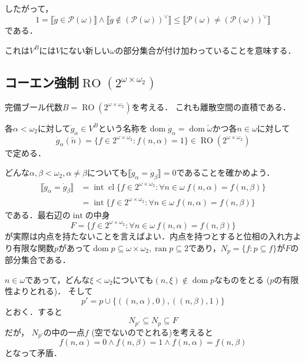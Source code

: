 \documentclass[uplatex,dvipdfmx]{jsarticle}
\newcommand{\PP}{\mathcal{P}}
\newcommand{\range}{\operatorname{ran}}
\newcommand{\dom}{\operatorname{dom}}
\newcommand{\intr}{\operatorname{int}}
\newcommand{\cl}{\operatorname{cl}}
\newcommand{\RO}{\operatorname{RO}}
\renewcommand\subset{\subseteq}
\newcommand{\truth}[1] {\llbracket #1 \rrbracket}
\theoremstyle{definition}
\begin{document}
したがって，
\[
1 = \truth{\dot{g} \in \PP(\omega)} \land \truth{\dot{g} \not \in  (\PP(\omega))^{\vee}} \le \truth{\PP(\omega) \ne (\PP(\omega))^{\vee}}
\]
である．

これは$V^B$には$V$にない新しい$\omega$の部分集合が付け加わっていることを意味する．

\subsection{コーエン強制$\RO(2^{\omega \times \omega_2})$}

完備ブール代数$B = \RO(2^{\omega \times \omega_2})$を考える．
これも離散空間の直積である．

各$\alpha < \omega_2$に対して$\dot{g}_\alpha \in V^B$という名称を$\dom \dot{g}_\alpha = \dom \check{\omega}$かつ各$n \in \omega$に対して
\[
\dot{g}_\alpha(\check{n}) = \{ f \in 2^{\omega \times \omega_2} : f(n, \alpha) = 1 \} \in \RO(2^{\omega \times \omega_2})
\]
で定める．

どんな$\alpha, \beta < \omega_2, \alpha \ne \beta$についても$\truth{\dot{g}_\alpha = \dot{g}_\beta} = 0$であることを確かめよう．
\begin{align*}
\truth{\dot{g}_\alpha = \dot{g}_\beta} &= \intr \cl \{ f \in 2^{\omega \times \omega_2} : \forall n \in \omega\ f(n, \alpha) = f(n, \beta) \} \\
 &= \intr \{ f \in 2^{\omega \times \omega_2} : \forall n \in \omega\ f(n, \alpha) = f(n, \beta) \}
\end{align*}
である．最右辺の$\intr$の中身
\[
F = \{ f \in 2^{\omega \times \omega_2} : \forall n \in \omega\ f(n, \alpha) = f(n, \beta) \}
\]
が実際は内点を持たないことを言えばよい．内点を持つとすると位相の入れ方より有限な関数$p$があって$\dom p \subset \omega \times \omega_2, \range p \subset 2$であり，$N_p = \{ f : p \subset f \}$が$F$の部分集合である．

$n \in \omega$であって，どんな$\xi < \omega_2$についても$(n, \xi) \not \in \dom p$なものをとる ($p$の有限性よりとれる)．
そして
\[
p' = p \cup \{ ((n, \alpha), 0), ((n, \beta), 1) \}
\]
とおく．すると
\[
N_{p'} \subset N_p \subset F
\]
だが，
$N_{p'}$の中の一点$f$ (空でないのでとれる)を考えると
\[
f(n, \alpha) = 0 \land f(n, \beta) = 1 \land f(n, \alpha) = f(n, \beta)
\]
となって矛盾．
\end{document}
